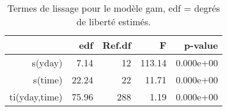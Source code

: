 \begin{table}[!ht]
\centering
\begin{tabular}{rrrrr}
  \hline
 & edf & Ref.df & F & p-value \\ 
  \hline
s(yday) & 7.14 & 12 & 113.14 & 0.000e+00 \\ 
  s(time) & 22.24 & 22 & 11.71 & 0.000e+00 \\ 
  ti(yday,time) & 75.96 & 288 & 1.19 & 0.000e+00 \\ 
   \hline
\end{tabular}
\caption{Termes de lissage pour le modèle gam, edf = degrés de liberté estimés.} 
\label{smpm.st}
\end{table}
